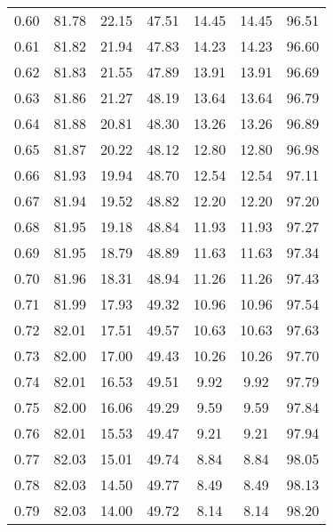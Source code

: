 \begin{tabular}{|c|c|c|c|c|c|c|}
      0.60 &     81.78 &     22.15 &      47.51 &   14.45 &      14.45 &         96.51 \\
      0.61 &     81.82 &     21.94 &      47.83 &   14.23 &      14.23 &         96.60 \\
      0.62 &     81.83 &     21.55 &      47.89 &   13.91 &      13.91 &         96.69 \\
      0.63 &     81.86 &     21.27 &      48.19 &   13.64 &      13.64 &         96.79 \\
      0.64 &     81.88 &     20.81 &      48.30 &   13.26 &      13.26 &         96.89 \\
      0.65 &     81.87 &     20.22 &      48.12 &   12.80 &      12.80 &         96.98 \\
      0.66 &     81.93 &     19.94 &      48.70 &   12.54 &      12.54 &         97.11 \\
      0.67 &     81.94 &     19.52 &      48.82 &   12.20 &      12.20 &         97.20 \\
      0.68 &     81.95 &     19.18 &      48.84 &   11.93 &      11.93 &         97.27 \\
      0.69 &     81.95 &     18.79 &      48.89 &   11.63 &      11.63 &         97.34 \\
      0.70 &     81.96 &     18.31 &      48.94 &   11.26 &      11.26 &         97.43 \\
      0.71 &     81.99 &     17.93 &      49.32 &   10.96 &      10.96 &         97.54 \\
      0.72 &     82.01 &     17.51 &      49.57 &   10.63 &      10.63 &         97.63 \\
      0.73 &     82.00 &     17.00 &      49.43 &   10.26 &      10.26 &         97.70 \\
      0.74 &     82.01 &     16.53 &      49.51 &    9.92 &       9.92 &         97.79 \\
      0.75 &     82.00 &     16.06 &      49.29 &    9.59 &       9.59 &         97.84 \\
      0.76 &     82.01 &     15.53 &      49.47 &    9.21 &       9.21 &         97.94 \\
      0.77 &     82.03 &     15.01 &      49.74 &    8.84 &       8.84 &         98.05 \\
      0.78 &     82.03 &     14.50 &      49.77 &    8.49 &       8.49 &         98.13 \\
      0.79 &     82.03 &     14.00 &      49.72 &    8.14 &       8.14 &         98.20 \\

\end{tabular}
